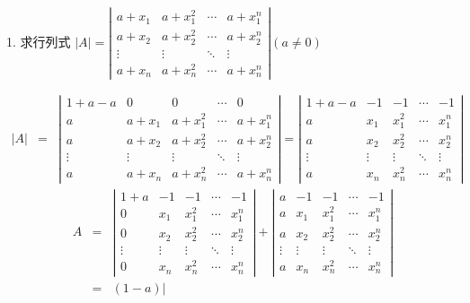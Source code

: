 1. 求行列式 $|A|=\left|\begin{matrix}
	a+x_{1}&a+x_{1}^2&\cdots&a+x_{1}^n\\
	a+x_{2}&a+x_{2}^2&\cdots&a+x_{2}^n\\
	\vdots&\vdots&\ddots&\vdots\\
	a+x_{n}&a+x_{n}^2&\cdots&a+x_{n}^n
\end{matrix} \right| (a\neq 0)$
\begin{solution}
	\begin{eqnarray*}
		|A|&=&\left|\begin{matrix}
			1+a-a&0&0&\cdots&0\\
			a&a+x_{1}&a+x_{1}^2&\cdots&a+x_{1}^n\\
			a&a+x_{2}&a+x_{2}^2&\cdots&a+x_{2}^n\\
			\vdots&\vdots&\vdots&\ddots&\vdots\\
			a&a+x_{n}&a+x_{n}^2&\cdots&a+x_{n}^n
		\end{matrix} \right|
		=\left|\begin{matrix}
			1+a-a&-1&-1&\cdots&-1\\
			a&x_{1}&x_{1}^2&\cdots&x_{1}^n\\
			a&x_{2}&x_{2}^2&\cdots&x_{2}^n\\
			\vdots&\vdots&\vdots&\ddots&\vdots\\
			a&x_{n}&x_{n}^2&\cdots&x_{n}^n
		\end{matrix} \right|
	\end{eqnarray*}
	\begin{eqnarray*}
		A&=&\left|\begin{matrix}
			1+a&-1&-1&\cdots&-1\\
			0&x_{1}&x_{1}^2&\cdots&x_{1}^n\\
			0&x_{2}&x_{2}^2&\cdots&x_{2}^n\\
			\vdots&\vdots&\vdots&\ddots&\vdots\\
			0&x_{n}&x_{n}^2&\cdots&x_{n}^n
		\end{matrix} \right|+\left|\begin{matrix}
			a&-1&-1&\cdots&-1\\
			a&x_{1}&x_{1}^2&\cdots&x_{1}^n\\
			a&x_{2}&x_{2}^2&\cdots&x_{2}^n\\
			\vdots&\vdots&\vdots&\ddots&\vdots\\
			a&x_{n}&x_{n}^2&\cdots&x_{n}^n
		\end{matrix} \right|\\
		&=&(1-a)\left|\begin{matrix}

\end{matrix}
\end{eqnarray*}
\end{solution}

